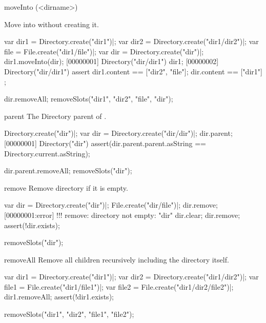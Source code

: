 \begin{urbiscriptapi}
\item[moveInto](<dirname>)
  \experimental{}

  Move \this into  without creating it.
\begin{urbiscript}[firstnumber=1]
var dir1 = Directory.create("dir1")|;
var dir2 = Directory.create("dir1/dir2")|;
var file = File.create("dir1/file")|;
var dir = Directory.create("dir")|;
dir1.moveInto(dir);
[00000001] Directory("dir/dir1")
dir1;
[00000002] Directory("dir/dir1")
assert
{
  dir1.content == ["dir2", "file"];
  dir.content == ["dir1"]
};
\end{urbiscript}
\begin{urbicomment}
dir.removeAll;
removeSlots("dir1", "dir2", "file", "dir");
\end{urbicomment}


\item[parent]
  The Directory parent of \this.
\begin{urbiscript}
Directory.create("dir")|;
var dir = Directory.create("dir/dir")|;
dir.parent;
[00000001] Directory("dir")
assert(dir.parent.parent.asString == Directory.current.asString);
\end{urbiscript}
\begin{urbicomment}
dir.parent.removeAll;
removeSlots("dir");
\end{urbicomment}


\item[remove]
  Remove \this directory if it is empty.
\begin{urbiscript}
var dir = Directory.create("dir")|;
File.create("dir/file")|;
dir.remove;
[00000001:error] !!! remove: directory not empty: "dir"
dir.clear;
dir.remove;
assert(!dir.exists);
\end{urbiscript}
\begin{urbicomment}
removeSlots("dir");
\end{urbicomment}


\item[removeAll]
  Remove all children recursively including the directory itself.
\begin{urbiscript}
var dir1 = Directory.create("dir1")|;
var dir2 = Directory.create("dir1/dir2")|;
var file1 = File.create("dir1/file1")|;
var file2 = File.create("dir1/dir2/file2")|;
dir1.removeAll;
assert(!dir1.exists);
\end{urbiscript}
\begin{urbicomment}
removeSlots("dir1", "dir2", "file1", "file2");
\end{urbicomment}



\end{urbiscriptapi}
